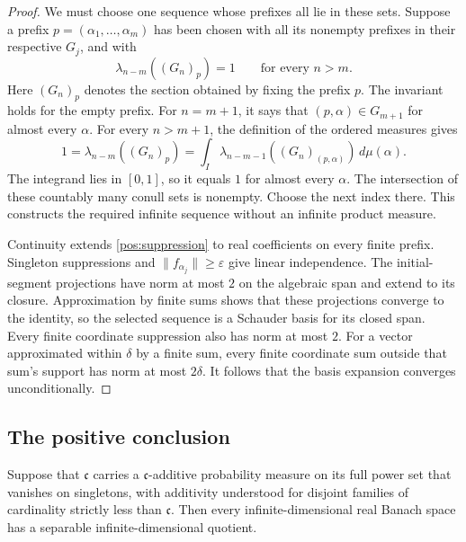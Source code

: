 \begin{proof}
We must choose one sequence whose prefixes all lie in these sets.
Suppose a prefix $p=(\alpha_1,\ldots,\alpha_m)$ has been chosen with
all its nonempty prefixes in their respective $G_j$, and with
\begin{equation}\label{pos:prefix-invariant}
 \lambda_{n-m}((G_n)_p)=1\qquad\text{for every }n>m.
\end{equation}
Here $(G_n)_p$ denotes the section obtained by fixing the prefix $p$.
The invariant holds for the empty prefix.  For $n=m+1$, it says that
$(p,\alpha)\in G_{m+1}$ for almost every $\alpha$.
For every $n>m+1$, the definition of the ordered measures gives
\[
 1=\lambda_{n-m}((G_n)_p)
  =\int_I\lambda_{n-m-1}((G_n)_{(p,\alpha)})\,d\mu(\alpha).
\]
The integrand lies in $[0,1]$, so it equals $1$ for almost every $\alpha$.
The intersection of these countably many conull sets is nonempty.
Choose the next index there.  This constructs the required infinite
sequence without an infinite product measure.

Continuity extends \eqref{pos:suppression} to real coefficients on every
finite prefix.  Singleton suppressions and $\|f_{\alpha_j}\|\ge\varepsilon$
give linear independence.  The initial-segment projections have norm
at most $2$ on the algebraic span and extend to its closure.  Approximation
by finite sums shows that these projections converge to the identity,
so the selected sequence is a Schauder basis for its closed span.
Every finite coordinate suppression also has norm at most $2$.
For a vector approximated within $\delta$ by a finite sum, every finite
coordinate sum outside that sum's support has norm at most $2\delta$.
It follows that the basis expansion converges unconditionally.
\end{proof}

\subsection{The positive conclusion}

\begin{theorem}\label{pos:theorem}
Suppose that $\mathfrak c$ carries a $\mathfrak c$-additive probability
measure on its full power set that vanishes on singletons, with additivity
understood for disjoint families of cardinality strictly less than
$\mathfrak c$.  Then every infinite-dimensional real Banach space has a
separable infinite-dimensional quotient.
\end{theorem}

